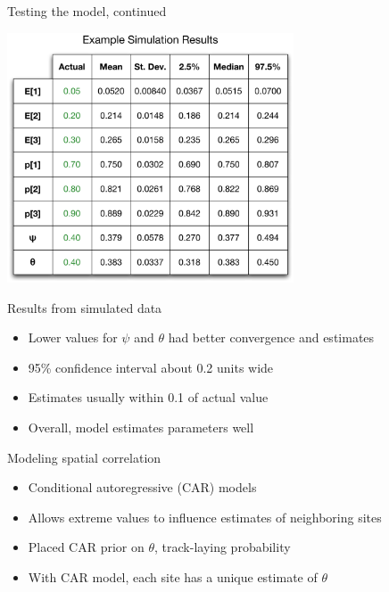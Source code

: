 \documentclass{beamer}
\begin{document}
\begin{frame}{Testing the model, continued}
	\begin{center}
		\includegraphics[width=8.5cm]{Figures/Diagrams/SimulatedData.pdf}
	\end{center}
\end{frame}

\begin{frame}{Results from simulated data}
	\begin{itemize}
		\item Lower values for $\psi$ and $\theta$ had better convergence and
		estimates
		\item 95\% confidence interval about 0.2 units wide
		\item Estimates usually within 0.1 of actual value
		\item Overall, model estimates parameters well
	\end{itemize}
\end{frame}

\begin{frame}{Modeling spatial correlation}
	\begin{itemize}
		\item Conditional autoregressive (CAR) models
		\item Allows extreme values to influence estimates of neighboring sites
		\item Placed CAR prior on $\theta$, track-laying probability
		\item With CAR model, each site has a unique estimate of $\theta$
	\end{itemize}
\end{frame}

\end{document}
